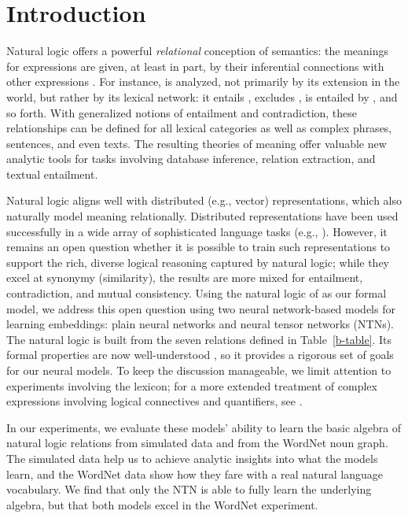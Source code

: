 \section{Introduction}\label{sec:intro}

Natural logic offers a powerful \emph{relational} conception of
semantics: the meanings for expressions are given, at least in part,
by their inferential connections with other expressions
\cite{vanBenthem08NATLOG,maccartney2009extended}. For instance,
 is analyzed, not primarily by its extension in the
world, but rather by its lexical network: it entails ,
excludes , is entailed by , and so forth. With generalized notions of entailment and
contradiction, these relationships can be defined for all lexical
categories as well as complex phrases, sentences, and even texts. The
resulting theories of meaning offer valuable new analytic tools for
tasks involving database inference, relation extraction, and textual
entailment.

Natural logic aligns well with distributed (e.g., vector)
representations, which also naturally model meaning relationally.
Distributed representations have been used successfully in a wide
array of sophisticated language tasks (e.g., \cite{collobert2011natural}). %
However, it remains an open question whether it is possible to train
such representations to support the rich, diverse logical reasoning
captured by natural logic; while they excel at synonymy (similarity),
the results are more mixed for entailment, contradiction, and mutual
consistency.  Using the natural logic of \cite{maccartney2009extended}
as our formal model, we address this open question using two neural
network-based models for learning embeddings: plain neural networks
and neural tensor networks (NTNs).  The natural logic is built from
the seven relations defined in Table~\ref{b-table}. Its formal
properties are now well-understood \cite{Icard:Moss:2013:LILT}, so it
provides a rigorous set of goals for our neural models. To keep the
discussion manageable, we limit attention to experiments involving the
lexicon; for a more extended treatment of complex expressions
involving logical connectives and quantifiers, see
\citet{Bowman:Potts:Manning:2014}.

In our experiments, we evaluate these models' ability to learn the
basic algebra of natural logic relations from simulated data and from
the WordNet noun graph. The simulated data help us to achieve analytic
insights into what the models learn, and the WordNet data show how they
fare with a real natural language vocabulary.  We find that only the NTN is able to fully
learn the underlying algebra, but that both models excel in the 
WordNet experiment.

